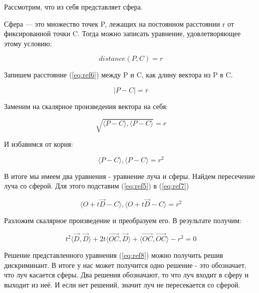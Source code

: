 Рассмотрим, что из себя представляет сфера.


Сфера — это множество точек P, лежащих на постоянном расстоянии r от фиксированной точки C. Тогда можно записать уравнение, удовлетворяющее этому условию:

\begin{equation}
	distance(P,C) = r
	\label{eq:ref6}
\end{equation}

Запишем расстояние (\ref{eq:ref6}) между P и C, как длину вектора из P в C.

\begin{equation}
	|P-C|=r
\end{equation}

Заменим на скалярное произведения вектора на себя:

\begin{equation}
	\sqrt{\langle P - C\rangle, \langle P - C\rangle} = r
\end{equation}

И избавимся от корня:

\begin{equation}
	\langle P - C\rangle, \langle P - C\rangle = r^2
	\label{eq:ref7}
\end{equation}

В итоге мы имеем два уравнения - уравнение луча и сферы. Найдем пересечение луча со сферой. Для этого подставим (\ref{eq:ref5}) в (\ref{eq:ref7})

\begin{equation}
	\langle O + t\overrightarrow{D} - C \rangle, \langle O + t\overrightarrow{D} - C\rangle = r^2
\end{equation}

Разложим скалярное произведение и преобразуем его. В результате получим:

\begin{equation}
	t^2 \langle \overrightarrow{D}, \overrightarrow{D} \rangle + 2t \langle \overrightarrow{OC}, \overrightarrow{D} \rangle + \langle \overrightarrow{OC}, \overrightarrow{OC} \rangle -r^2 = 0
	\label{eq:ref8}
\end{equation}

Решение представленного уравнения (\ref{eq:ref8}) можно получить решив дискриминант.
В итоге у нас может получится одно решение - это обозначает, что луч касается сферы.
Два решения обозначают, то что луч входит в сферу и выходит из неё.
И если нет решений, значит луч не пересекается со сферой.

